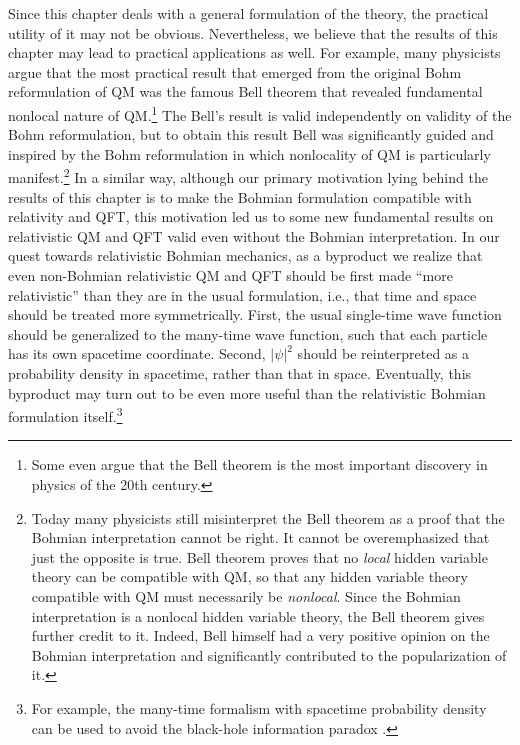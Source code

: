 \documentclass[12pt,twoside]{report} %
\begin{document}
Since this chapter deals with a general formulation of the theory, the practical
utility of it may not be obvious. Nevertheless, we believe that the results of this
chapter may lead to practical applications as well. 
For example, many physicists argue that the most practical result that emerged 
from the original Bohm reformulation of QM was the famous Bell theorem 
that revealed fundamental nonlocal nature of QM.\footnote{Some 
even argue that the Bell theorem is the most important discovery
in physics of the 20th century.} The Bell's result is valid independently
on validity of the Bohm reformulation, but to obtain this result Bell was significantly 
guided and inspired by the Bohm reformulation in which nonlocality of QM is particularly 
manifest.\footnote{Today many physicists still misinterpret the Bell theorem
as a proof that the Bohmian interpretation cannot be right. It cannot 
be overemphasized that just the opposite is true. Bell theorem proves that no
{\em local} hidden variable theory can be compatible with QM, so that any
hidden variable theory compatible with QM must necessarily be {\em nonlocal}.
Since the Bohmian interpretation is a nonlocal hidden variable theory, 
the Bell theorem gives further credit to it. Indeed, Bell himself
had a very positive opinion on the Bohmian interpretation and significantly
contributed to the popularization of it.}
In a similar way, although our primary motivation lying behind the results of this
chapter is to make the Bohmian formulation compatible with relativity and QFT,
this motivation led us to some new fundamental results on relativistic QM and QFT
valid even without the Bohmian interpretation. In our quest towards
relativistic Bohmian mechanics, as a byproduct we realize that even
non-Bohmian relativistic QM and QFT should be first made ``more relativistic''
than they are in the usual formulation, i.e., that time and space should be treated
more symmetrically. First, the usual single-time wave function should be generalized
to the many-time wave function, such that each particle has its own spacetime coordinate.
Second, $|\psi|^2$ should be reinterpreted as a probability density in spacetime, rather than that in space. 
Eventually, this byproduct may turn out to be even more useful than the
relativistic Bohmian formulation itself.\footnote{For example, the many-time
formalism with spacetime probability density can be used to avoid the black-hole
information paradox \cite{nikbh1,nikbh2}.} 
\end{document}

